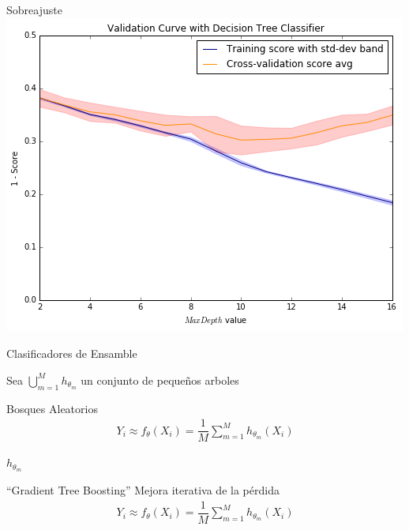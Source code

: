 \documentclass[xcolor=x11names]{beamer}
\begin{document}

\begin{frame}{Sobreajuste}
\center\
\includegraphics[width=1\textheight]{figure-biasVariance/dtree_overfit_problem_2.png}
\end{frame}


\begin{frame}{Clasificadores de Ensamble }
	
	Sea $\bigcup\limits_{m=1}^{M} h_{\theta_m}$ un conjunto de pequeños arboles
	
	\begin{block}{Bosques Aleatorios} 
		\begin{align*}
			Y_i \approx f_{\theta}(X_i) = \dfrac{1}{M}\sum_{m=1}^M h_{\theta_m}(X_i) 
		\end{align*}

	\end{block}
	$ h_{\theta_m}$

	\begin{block}{``Gradient Tree Boosting''}
	Mejora iterativa de la pérdida 
		\begin{align*}
			Y_i \approx f_{\theta}(X_i) = \dfrac{1}{M}\sum_{m=1}^M h_{\theta_m}(X_i) 
		\end{align*}
	\end{block}


\end{frame}
\end{document}
